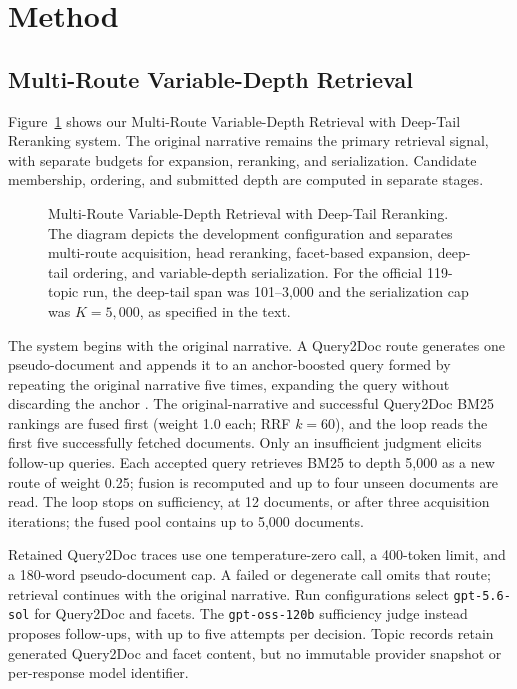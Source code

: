 \section{Method}

\subsection{Multi-Route Variable-Depth Retrieval}
\label{sec:retrieval-method}

Figure~\ref{fig:retrieval} shows our Multi-Route Variable-Depth
Retrieval with Deep-Tail Reranking system. The original narrative
remains the primary retrieval signal, with separate budgets for
expansion, reranking, and serialization. Candidate membership,
ordering, and submitted depth are computed in separate stages.

\begin{figure}[t]
\centering
\resizebox{0.95\textwidth}{!}{}
\caption{Multi-Route Variable-Depth Retrieval with Deep-Tail Reranking.
The diagram depicts the development configuration and separates
multi-route acquisition, head reranking, facet-based expansion,
deep-tail ordering, and variable-depth serialization. For the official
119-topic run, the deep-tail span was 101--3,000 and the serialization
cap was $K=5{,}000$, as specified in the text.}
\label{fig:retrieval}
\end{figure}

The system begins with the original narrative. A Query2Doc route
generates one pseudo-document and appends it to an anchor-boosted query
formed by repeating the original narrative five times, expanding the
query without discarding the anchor
\citep{wang2023query2doc}. The original-narrative and successful
Query2Doc BM25 rankings are fused first (weight 1.0 each; RRF $k=60$),
and the loop reads the first five successfully fetched documents. Only
an insufficient judgment elicits follow-up queries. Each accepted query
retrieves BM25 to depth 5,000 as a new route of weight 0.25; fusion is
recomputed and up to four unseen documents are read. The loop stops on
sufficiency, at 12 documents, or after three acquisition iterations;
the fused pool contains up to 5,000 documents.

Retained Query2Doc traces use one temperature-zero call, a 400-token
limit, and a 180-word pseudo-document cap. A failed or degenerate call
omits that route; retrieval continues with the original narrative. Run configurations
select \texttt{gpt-5.6-sol} for Query2Doc and facets. The
\texttt{gpt-oss-120b} sufficiency judge instead proposes follow-ups,
with up to five attempts per decision. Topic records retain generated
Query2Doc and facet content, but no immutable provider snapshot or
per-response model identifier.


